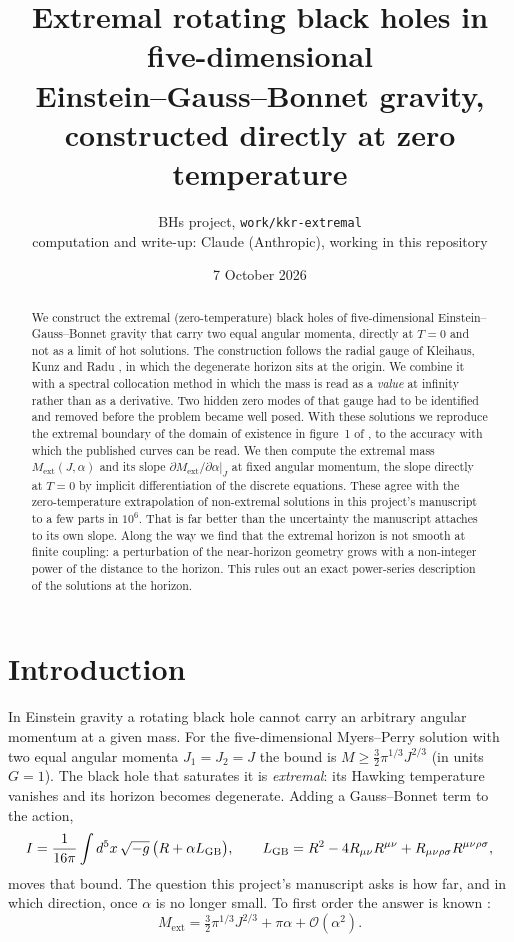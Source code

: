 \documentclass[11pt,a4paper]{article}
\title{Extremal rotating black holes in five-dimensional\\
Einstein--Gauss--Bonnet gravity, constructed directly at zero temperature}
\author{BHs project, \texttt{work/kkr-extremal}\\[2pt]
\small computation and write-up: Claude (Anthropic), working in this repository}
\date{7 October 2026}
\newcommand{\ext}{\mathrm{ext}}
\begin{document}
\maketitle

\begin{abstract}
We construct the extremal (zero-temperature) black holes of five-dimensional
Einstein--Gauss--Bonnet gravity that carry two equal angular momenta, directly
at $T=0$ and not as a limit of hot solutions. The construction follows the
radial gauge of Kleihaus, Kunz and Radu \cite{KKR2023}, in which the degenerate
horizon sits at the origin. We combine it with a spectral collocation method in
which the mass is read as a \emph{value} at infinity rather than as a derivative.
Two hidden zero modes of that gauge had to be identified and removed before the
problem became well posed. With these solutions we reproduce the extremal
boundary of the domain of existence in figure~1 of \cite{KKR2023}, to the
accuracy with which the published curves can be read. We then compute the
extremal mass $M_\ext(J,\alpha)$ and its slope
$\partial M_\ext/\partial\alpha|_J$ at fixed angular momentum, the slope
directly at $T=0$ by implicit differentiation of the discrete equations. These
agree with the zero-temperature extrapolation of non-extremal solutions in this
project's manuscript to a few parts in $10^{6}$. That is far better than the
uncertainty the manuscript attaches to its own slope. Along the way we find that
the extremal horizon is not smooth at finite coupling: a perturbation of the
near-horizon geometry grows with a non-integer power of the distance to the
horizon. This rules out an exact power-series description of the solutions at
the horizon.
\end{abstract}

\tableofcontents

\section{Introduction}

In Einstein gravity a rotating black hole cannot carry an arbitrary angular
momentum at a given mass. For the five-dimensional Myers--Perry solution with two
equal angular momenta $J_1=J_2=J$ the bound is
$M\ge\tfrac32\pi^{1/3}J^{2/3}$ (in units $G=1$). The black hole that saturates it
is \emph{extremal}: its Hawking temperature vanishes and its horizon becomes
degenerate. Adding a Gauss--Bonnet term to the action,
\begin{equation}
  I=\frac{1}{16\pi}\int d^5x\,\sqrt{-g}\,\bigl(R+\alpha L_{\rm GB}\bigr),\qquad
  L_{\rm GB}=R^2-4R_{\mu\nu}R^{\mu\nu}+R_{\mu\nu\rho\sigma}R^{\mu\nu\rho\sigma},
  \label{eq:action}
\end{equation}
moves that bound. The question this project's manuscript asks is how far, and in
which direction, once $\alpha$ is no longer small. To first order the answer is
known \cite{MaLiLu2020}:
\begin{equation}
  M_\ext=\tfrac32\pi^{1/3}J^{2/3}+\pi\alpha+\mathcal O(\alpha^2).
  \label{eq:firstorder}
\end{equation}
\end{document}

